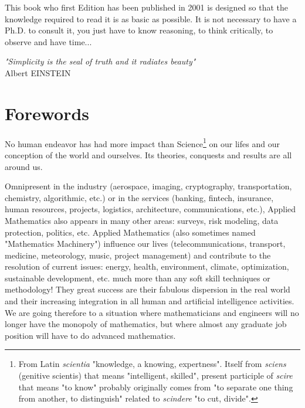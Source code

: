 	\newpage
	\thispagestyle{empty}
	\mbox{}
	This book who first Edition has been published in 2001 is designed so that the knowledge required to read it is as basic as possible. It is not necessary to have a Ph.D. to consult it, you just have to know reasoning, to think critically, to observe and have time...
	\begin{flushright}
	\textit{"Simplicity is the seal of truth and it radiates beauty"} \\
	 Albert EINSTEIN
	\end{flushright}
	
	\section{Forewords}
	No human endeavor has had more impact than Science\footnote{From Latin \textit{scientia} "knowledge, a knowing, expertness". Itself from \textit{sciens} (genitive scientis) that means "intelligent, skilled", present participle of \textit{scire} that means "to know" probably originally comes from "to separate one thing from another, to distinguish" related to \textit{scindere} "to cut, divide".} on our lifes and our conception of the world and ourselves. Its theories, conquests and results are all around us.

	Omnipresent in the industry (aerospace, imaging, cryptography, transportation, chemistry, algorithmic, etc.) or in the services (banking, fintech, insurance, human resources, projects, logistics, architecture, communications, etc.), Applied Mathematics also appears in many other areas: surveys, risk modeling, data protection, politics, etc.  Applied Mathematics (also sometimes named "Mathematics Machinery") influence our lives (telecommunications, transport, medicine, meteorology, music, project management) and contribute to the resolution of current issues: energy, health, environment, climate, optimization, sustainable development, etc. much more than any soft skill techniques or methodology! They great success are their fabulous dispersion in the real world and their increasing integration in all human and artificial intelligence activities. We are going therefore to a situation where mathematicians and engineers will no longer have the monopoly of mathematics, but where almost any graduate job position will have to do advanced mathematics.

